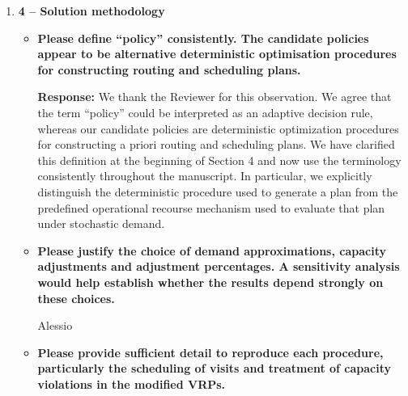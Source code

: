 \documentclass[11pt]{article}
\begin{document}
\begin{enumerate}
\noindent\textbf{Response:} We thank the Reviewer for this observation. Assigning demand increments to the beginning of each time slot is a modelling convention adopted to represent intraday waste accumulation within a discrete-time framework. The increments represent waste generated over the corresponding intervals, rather than waste physically generated instantaneously at their beginning. We acknowledge that the temporal resolution may influence the quantity of waste available at the time of collection, particularly for visits occurring close to time-slot boundaries. A finer discretisation can provide a more accurate representation of demand evolution, at the expense of increased computational complexity. We have added a discussion of this trade-off and clarified that the proposed formulation can accommodate different time-slot durations without requiring structural modifications.

 
\vspace{1mm}
xxx

\item \textbf{4 -- Solution methodology}
\begin{itemize}
\item \textbf{Please define “policy” consistently. The candidate policies appear to be alternative
deterministic optimisation procedures for constructing routing and scheduling plans.}


\noindent\textbf{Response:} We thank the Reviewer for this observation. We agree that the term ``policy'' could be interpreted as an adaptive decision rule, whereas our candidate policies are deterministic optimization procedures for constructing a priori routing and scheduling plans. We have clarified this definition at the beginning of Section 4 and now use the terminology consistently throughout the manuscript. In particular, we explicitly distinguish the deterministic procedure used to generate a plan from the predefined operational recourse mechanism used to evaluate that plan under stochastic demand.

 




\item \textbf{Please justify the choice of demand approximations, capacity adjustments and
adjustment percentages. A sensitivity analysis would help establish whether the results
depend strongly on these choices.}

Alessio


\item \textbf{Please provide sufficient detail to reproduce each procedure, particularly the scheduling
of visits and treatment of capacity violations in the modified VRPs.}


\end{itemize}
\end{enumerate}
\end{document}
